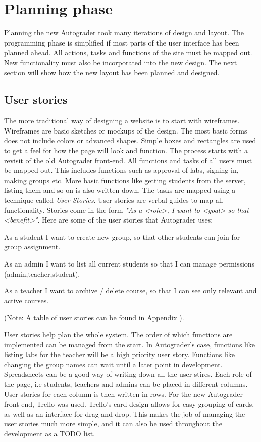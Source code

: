 \section{Planning phase}
Planning the new Autograder took many iterations of design and layout. The programming phase is simplified if most parts of the user interface has been planned ahead. All actions, tasks and functions of the site must be mapped out. New functionality must also be incorporated into the new design. The next section will show how the new layout has been planned and designed.


\subsection{User stories}
The more traditional way of designing a website is to start with wireframes. Wireframes are basic sketches or mockups of the design. The most basic forms does not include colors or advanced shapes. Simple boxes and rectangles are used to get a feel for how the page will look and function. The process starts with a revisit of the old Autograder front-end. All functions and tasks of all users must be mapped out. This includes functions such as approval of labs, signing in, making groups etc. More basic functions like getting students from the server, listing them and so on is also written down. The tasks are mapped using a technique called \emph{User Stories}. User stories are verbal guides to map all functionality. Stories come in the form \emph{"As a <role>, I want to <goal> so that <benefit>"}. Here are some of the user stories that Autograder uses;

\begin{itemize*}
\item As a student I want to create new group, so that other students can join for group assignment.
\item As an admin I want to list all current students so that I can manage permissions (admin,teacher,student).
\item As a teacher I want to archive / delete course, so that I can see only relevant and active courses.
\end{itemize*}

(Note: A table of user stories can be found in Appendix ).

User stories help plan the whole system. The order of which functions are implemented can be managed from the start. In Autograder's case, functions like listing labs for the teacher will be a high priority user story. Functions like changing the group names can wait until a later point in development. Spreadsheets can be a good way of writing down all the user stires. Each role of the page, i.e students, teachers and admins can be placed in different columns. User stories for each column is then written in rows. For the new Autograder front-end, Trello was used. Trello's card design allows for easy grouping of cards, as well as an interface for drag and drop. This makes the job of managing the user stories much more simple, and it can also be used throughout the development as a TODO list.

